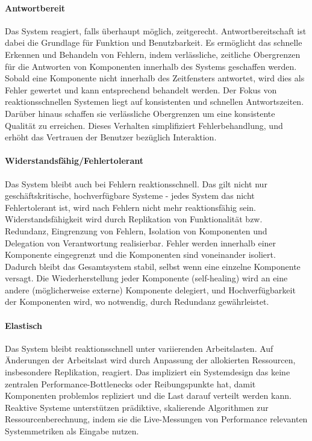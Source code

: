 \paragraph{Antwortbereit}Das System reagiert, falls überhaupt möglich, zeitgerecht. Antwortbereitschaft ist dabei die Grundlage für Funktion und
Benutzbarkeit. Es ermöglicht das schnelle Erkennen und Behandeln von Fehlern, indem verlässliche, zeitliche Obergrenzen für die Antworten von
Komponenten innerhalb des Systems geschaffen werden. Sobald eine Komponente nicht innerhalb des Zeitfensters antwortet, wird dies als Fehler gewertet und kann
entsprechend behandelt werden.
Der Fokus von reaktionsschnellen Systemen liegt auf konsistenten und schnellen Antwortszeiten. Darüber hinaus schaffen sie
verlässliche Obergrenzen um eine konsistente Qualität zu erreichen.
Dieses Verhalten simplifiziert Fehlerbehandlung, und erhöht das Vertrauen der Benutzer bezüglich Interaktion.

\paragraph{Widerstandsfähig/Fehlertolerant}Das System bleibt auch bei Fehlern reaktionsschnell. Das gilt nicht nur geschäftskritische, hochverfügbare Systeme -
jedes System das nicht Fehlertolerant ist, wird nach Fehlern nicht mehr reaktionsfähig sein.
Widerstandsfähigkeit wird durch Replikation von Funktionalität bzw. Redundanz, Eingrenzung von Fehlern, Isolation von Komponenten und
Delegation von Verantwortung realisierbar.
Fehler werden innerhalb einer Komponente eingegrenzt und die Komponenten sind voneinander isoliert. Dadurch bleibt das Gesamtsystem stabil, selbst
wenn eine einzelne Komponente versagt.
Die Wiederherstellung jeder Komponente (self-healing) wird an eine andere (möglicherweise externe) Komponente delegiert, und
Hochverfügbarkeit der Komponenten wird, wo notwendig, durch Redundanz gewährleistet.

\paragraph{Elastisch}Das System bleibt reaktionsschnell unter variierenden Arbeitslasten. Auf Änderungen der Arbeitslast wird durch
Anpassung der allokierten Ressourcen, insbesondere Replikation, reagiert. Das impliziert ein Systemdesign das keine zentralen Performance-Bottlenecks oder
Reibungspunkte hat, damit Komponenten problemlos repliziert und die Last darauf verteilt werden kann.
Reaktive Systeme unterstützen prädiktive, skalierende Algorithmen zur Ressourcenberechnung,
indem sie die Live-Messungen von Performance relevanten Systemmetriken als Eingabe nutzen.

